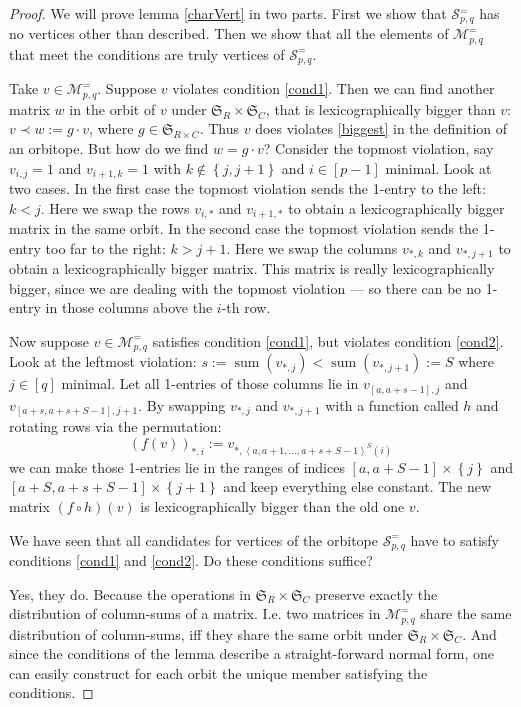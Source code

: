 \documentclass[a4paper]{amsart}
\theoremstyle{lemma}
\theoremstyle{definition}
\theoremstyle{remark}
\theoremstyle{example}
\newcommand{\lr}[1]{\ensuremath{\left( #1 \right)}}
\newcommand{\lrE}[1]{\ensuremath{\left[ #1 \right]}}
\newcommand{\lrM}[1]{\ensuremath{\left\{ #1 \right\}}}
\newcommand{\lrX}[1]{\ensuremath{\left< #1 \right>}}
\newcommand{\M}{\ensuremath{\mathcal{M}}}
\newcommand{\calS}{\ensuremath{\mathcal{S}}}
\newcommand{\Sym}{\ensuremath{\mathfrak{S}}}
\newcommand{\SymRC}{\ensuremath{\Sym_R \times \Sym_C}}
\begin{document}
\begin{proof}
  We will prove lemma \ref{charVert} in two parts.  First we show that
  \(\calS{}^=_{p, q}\) has no vertices other than described.  Then we
  show that all the elements of \(\M^=_{p, q}\) that meet the
  conditions are truly vertices of \(\calS^=_{p, q}\). 

  Take \(v \in \M^=_{p, q}\).  Suppose \(v\) violates condition
  \ref{cond1}.  Then we can find another matrix \(w\) in the orbit of
  \(v\) under \(\SymRC\), that is lexicographically bigger than \(v\):
  \(v \prec w := g \cdot v\), where \(g \in \Sym_{R \times C}\).  Thus
  \(v\) does violates \ref{biggest} in the definition of an
  orbitope.  %
  But how do we find \(w = g \cdot v\)?  Consider the topmost
  violation, say \(v_{i,j} = 1\) and \(v_{i+1,k} = 1\) with \(k \notin
  \lrM{j,j+1}\) and \(i \in \lrE{p-1}\) minimal.  Look at two
  cases. In the first case the topmost violation sends the 1-entry to
  the left: \(k < j\).  Here we swap the rows \(v_{i,*}\) and
  \(v_{i+1,*}\) to obtain a lexicographically bigger matrix in the
  same orbit.  In the second case the topmost violation sends the
  1-entry too far to the right: \(k > j+1\).  Here we swap the columns
  \(v_{*,k}\) and \(v_{*,j+1}\) to obtain a lexicographically bigger
  matrix.  This matrix is really lexicographically bigger, since we
  are dealing with the topmost violation --- so there can be no
  1-entry in those columns above the \(i\)-th row.

  Now suppose \(v \in \M^=_{p, q}\) satisfies condition \ref{cond1}, but violates
  condition \ref{cond2}.  Look at the leftmost violation:
  \(s := \mathop{sum} \lr{v_{*,j}} < \mathop{sum} \lr{v_{*,j+1}} := S\) where \(j \in
  \lrE{q}\) minimal.  Let all 1-entries of those columns lie in
  \(v_{\lrE{a,a+s-1},j}\) and \(v_{\lrE{a+s,a+s+S-1},j+1}\).  By
  swapping \(v_{*,j}\) and \(v_{*,j+1}\) with a function called \(h\) and rotating rows via the permutation:
    \[\lr{f \lr{v}}_{*,i} :=  v_{*,\lrX{a, a+1, \dots, a+s+S-1}^S \lr{i}}
  \]
  we can make those 1-entries lie in the ranges of indices
  \({\lrE{a,a+S-1} \times \lrM{j}}\) and \({\lrE{a+S,a+s+S-1} \times
    \lrM{j+1}}\) and keep everything else constant.  The new matrix
  \(\lr{f \circ h} \lr{v}\) is lexicographically bigger than the old
  one \(v\).

  We have seen that all candidates for vertices of the orbitope
  \(\calS^=_{p, q}\) have to satisfy conditions \ref{cond1} and
  \ref{cond2}.  Do these conditions suffice?

  Yes, they do.  Because the operations in \(\SymRC\) preserve exactly
  the distribution of column-sums of a matrix.  I.e. two matrices in
  \(\M^=_{p, q}\) share the same distribution of column-sums, iff they
  share the same orbit under \(\SymRC\).  And since the conditions of
  the lemma describe a straight-forward normal form, one can easily
  construct for each orbit the unique member satisfying the conditions.
\end{proof}
\end{document}
